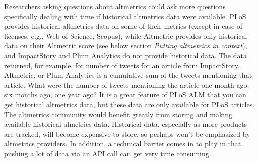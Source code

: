 \documentclass[letterpaper,superscriptaddress,showkeys,longbibliography]{revtex4-1}\usepackage{graphicx, color}
\begin{document}
Researchers asking questions about altmetrics could ask more questions specifically dealing with time if historical altmetrics data were available. PLoS provides historical altmetrics data on some of their metrics (except in case of licenses, e.g., Web of Science, Scopus), while Altmetric provides only historical data on their Altmetric score (see below section \emph{Putting altmetrics in context}), and ImpactStory and Plum Analytics do not provide historical data. The data returned, for example, for number of tweets for an article from ImpactStory, Altmetric, or Plum Analytics is a cumulative sum of the tweets mentioning that article. What were the number of tweets mentioning the article one month ago, six months ago, one year ago? It is a great feature of PLoS ALM that you can get historical altmetrics data, but these data are only available for PLoS articles. The altmetrics community would benefit greatly from storing and making available historical almetrics data. Historical data, especially as more products are tracked, will become expensive to store, so perhaps won't be emphasized by altmetrics providers. In addition, a technical barrier comes in to play in that pushing a lot of data via an API call can get very time consuming. 



\end{document}
